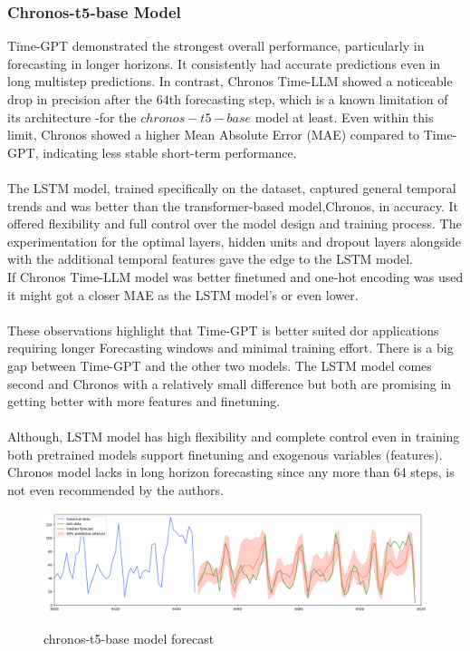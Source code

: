 \documentclass{article}
\begin{document}
\subsubsection{Chronos-t5-base Model}
Time-GPT demonstrated the strongest overall performance, particularly in forecasting in longer horizons. It consistently had accurate predictions even in long multistep predictions. In contrast, Chronos Time-LLM showed a noticeable drop in precision after the 64th forecasting step, which is a known limitation of its architecture -for the $chronos-t5-base$ model at least. Even within this limit, Chronos showed a higher Mean Absolute Error (MAE) compared to Time-GPT, indicating less stable short-term performance. \\
\\
The LSTM model, trained specifically on the dataset, captured general temporal trends and was better than the transformer-based model,Chronos, in accuracy. It offered flexibility and full control over the model design and training process. The experimentation for the optimal layers, hidden units and dropout layers alongside with the additional temporal features gave the edge to the LSTM model.\\
If Chronos Time-LLM model was better finetuned and one-hot encoding was used it might got a closer MAE as the LSTM model's or even lower.\\
\\
These observations highlight that Time-GPT is better suited dor applications requiring longer Forecasting windows and minimal training effort. There is a big gap between Time-GPT and the other two models. The LSTM model comes second and Chronos with a relatively small difference but both are promising in getting better with more features and finetuning.\\
\\
Although, LSTM model has high flexibility and complete control even in training both pretrained models support finetuning and exogenous variables (features).\\
Chronos model lacks in long horizon forecasting since any more than 64 steps, is not even recommended by the authors.

\begin{figure}[h]
\includegraphics[width=1\linewidth]{images/chronos_forecast.png}
    \label{fig:mesh1}
    \caption{chronos-t5-base model forecast}
\end{figure}
\end{document}
